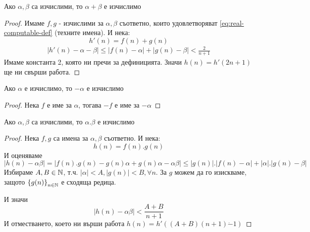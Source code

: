 \begin{lemma}\label{lem:sum-computable}
    Ако $\alpha, \beta$ са изчислими, то $\alpha + \beta$ е изчислимо
\end{lemma}
\begin{proof}
    Имаме $f, g$ - изчислими за $\alpha, \beta$ съответно, които удовлетворяват \eqref{eq:real-computable-def} (техните имена). И нека:
    \begin{equation*}
        h'(n) = f(n) + g(n)
    \end{equation*}
    \begin{equation*}
        \begin{split}
            |h'(n) - \alpha - \beta| \leq |f(n) - \alpha| + |g(n) - \beta| < \frac{2}{n+1}
        \end{split}
    \end{equation*}
    Имаме константа 2, която ни пречи за дефиницията. Значи $h(n) = h'(2n+1)$ ще ни свърши работа.
\end{proof}
\begin{lemma}\label{lem:neg-computable}
    Ако $\alpha$ е изчислимо, то $- \alpha$ е изчислимо
\end{lemma}
\begin{proof}
    Нека $f$ е име за $\alpha$, тогава $-f$ е име за $-\alpha$
\end{proof}
\begin{lemma}\label{lem:mul-computable}
    Ако $\alpha, \beta$ са изчислими, то $\alpha . \beta$ е изчислимо
\end{lemma}
\begin{proof}
    Нека $f, g$ са имена за $\alpha, \beta$ съответно. И нека:
    \begin{equation*}
        h(n) = f(n).g(n)
    \end{equation*}
    И оценяваме
    \begin{equation*}
        |h(n) - \alpha\beta| = |f(n).g(n) - g(n)\alpha + g(n)\alpha - \alpha\beta| \leq |g(n)|.|f(n) - \alpha| + |\alpha|.|g(n) - \beta|
    \end{equation*}
    Избираме $A, B\in {\mathbb{N}}$, т.ч. $|\alpha| < A, |g(n)| < B, \forall n$. За $g$ можем да го изискваме, защото $\left\{g(n)\right\}_{n\in{\mathbb{N}}}$ е сходяща редица. 
    
    И значи
    \begin{equation*}
        |h(n) - \alpha\beta| < \frac{A+B}{n+1}
    \end{equation*}
    И отместването, което ни върши работа $h(n) = h'((A+B)(n+1) \dot{-} 1)$
\end{proof}

